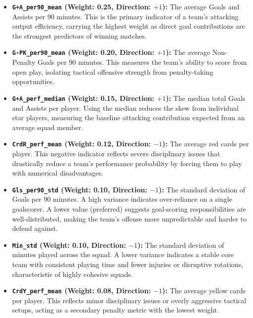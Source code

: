 \documentclass[a4paper,12pt]{report}
\begin{document}
\begin{itemize}
    \item \textbf{\texttt{G+A\_}\allowbreak\texttt{per90\_}\allowbreak\texttt{mean} (Weight: 0.25, Direction: $+1$):} The average Goals and Assists per 90 minutes. This is the primary indicator of a team's attacking output efficiency, carrying the highest weight as direct goal contributions are the strongest predictors of winning matches.
    \item \textbf{\texttt{G-PK\_}\allowbreak\texttt{per90\_}\allowbreak\texttt{mean} (Weight: 0.20, Direction: $+1$):} The average Non-Penalty Goals per 90 minutes. This measures the team's ability to score from open play, isolating tactical offensive strength from penalty-taking opportunities.
    \item \textbf{\texttt{G+A\_perf\_median} (Weight: 0.15, Direction: $+1$):} The median total Goals and Assists per player. Using the median reduces the skew from individual star players, measuring the baseline attacking contribution expected from an average squad member.
    \item \textbf{\texttt{CrdR\_perf\_mean} (Weight: 0.12, Direction: $-1$):} The average red cards per player. This negative indicator reflects severe disciplinary issues that drastically reduce a team's performance probability by forcing them to play with numerical disadvantages.
    \item \textbf{\texttt{Gls\_per90\_std} (Weight: 0.10, Direction: $-1$):} The standard deviation of Goals per 90 minutes. A high variance indicates over-reliance on a single goalscorer. A lower value (preferred) suggests goal-scoring responsibilities are well-distributed, making the team's offense more unpredictable and harder to defend against.
    \item \textbf{\texttt{Min\_std} (Weight: 0.10, Direction: $-1$):} The standard deviation of minutes played across the squad. A lower variance indicates a stable core team with consistent playing time and fewer injuries or disruptive rotations, characteristic of highly cohesive squads.
    \item \textbf{\texttt{CrdY\_perf\_mean} (Weight: 0.08, Direction: $-1$):} The average yellow cards per player. This reflects minor disciplinary issues or overly aggressive tactical setups, acting as a secondary penalty metric with the lowest weight.
\end{itemize}
\end{document}
